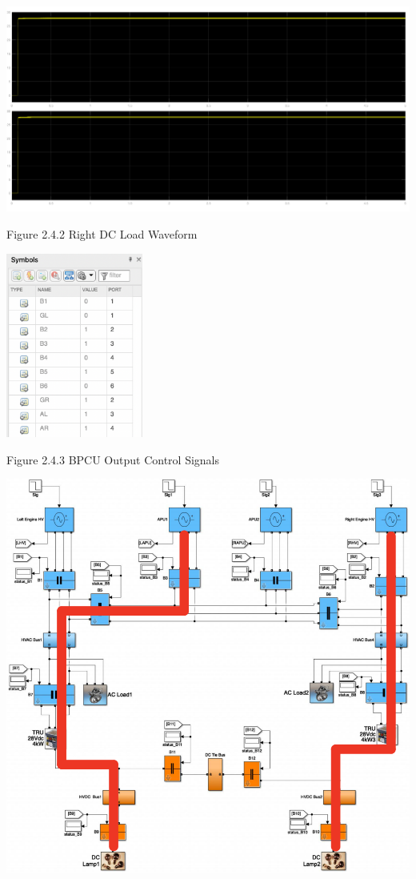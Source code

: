 \documentclass{mcmthesis}
\begin{document}
\includegraphics[trim= 0 0.255\imageheight{} 0 0, clip, width = 0.185\imageheight{}]{gl_down_load2.png}
\begin{center}
\small{Figure 2.4.2 Right DC Load Waveform}
\end{center}
\begin{center}
\includegraphics[width=4.5cm]{gl_down_signals.png}
\end{center}
\begin{center}
\small{Figure 2.4.3 BPCU Output Control Signals}
\end{center}
\begin{center}
\includegraphics[width=14.5cm]{gl_down.png}
\end{center}
\end{document}
